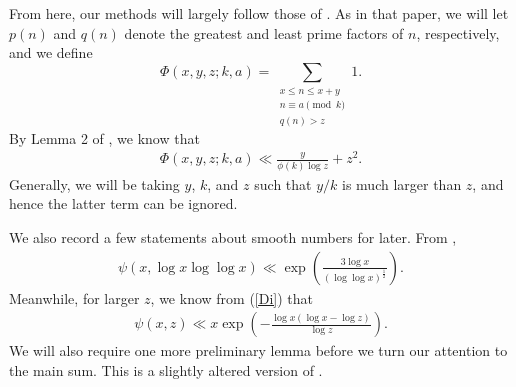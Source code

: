 \documentclass{amsart}
\begin{document}
From here, our methods will largely follow those of \cite{Sh}.  As in that paper, we will let $p(n)$ and $q(n)$ denote the greatest and least prime factors of $n$, respectively, and we define
$$\Phi(x,y,z;k,a)=\sum_{\substack{x\leq n\leq x+y \\ n\equiv a \pmod k \\ q(n)>z}}1.$$
By Lemma 2 of \cite{Sh}, we know that 
\begin{gather}\label{rough}\Phi(x,y,z;k,a)\ll \frac{y}{\phi(k)\log z}+z^2.\end{gather}
Generally, we will be taking $y$, $k$, and $z$ such that $y/k$ is much larger than $z$, and hence the latter term can be ignored.

We also record a few statements about smooth numbers for later.  From \cite[Lemma 1]{Sh},
\begin{gather}\label{psibound}
\psi(x,\log x\log\log x)\ll \exp\left(\frac{3\log x}{(\log \log x)^\frac 12}\right).
\end{gather}
Meanwhile, for larger $z$, we know from (\ref{Di}) that
\begin{gather}\label{smoothbd}
\psi(x,z)\ll x\exp\left(-\frac{\log x(\log x-\log z)}{\log z}\right).
\end{gather}
We will also require one more preliminary lemma before we turn our attention to the main sum.  This is a slightly altered version of \cite[Lemma 4]{Sh}.
\end{document}
